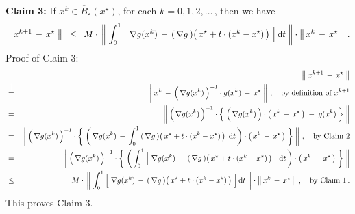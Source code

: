 \begin{enumerate}
	\vskip 0.3cm
	\noindent
	\textbf{Claim 3:}\quad
	If $x^{k} \in \overline{B}_{\varepsilon}(x^{\star})$, for each $k = 0,1,2,\ldots$\,,
	then we have
	\begin{equation*}
	\left\Vert\;x^{k+1} \,-\, x^{\star}\;\right\Vert
	\;\; \leq \;\;
		M \cdot\,
		\left\Vert\;
			\int_{0}^{1}
			\left[\;
				\overset{{\color{white}.}}{\nabla} g(x^{k})
				\,-\,
				\left(\,\nabla g\,\right)\!\left(\,x^{\star} + t\cdot(x^{k}-x^{\star})\,\right)
			\;\right]
			\d t
		\;\right\Vert
		\cdot
		\left\Vert\,x^{k} \,-\, x^{\star}\,\right\Vert\,.
	\end{equation*}
	Proof of Claim 3: \quad
	\begin{eqnarray*}
	&&
		\left\Vert\;x^{k+1} \,-\, x^{\star}\;\right\Vert
	\\
	&\overset{{\color{white}\textnormal{\Large 1}}}{=}&
		\left\Vert\;x^{k} \,-\, \left(\,\overset{{\color{white}.}}{\nabla} g(x^{k})\,\right)^{-1}\cdot g(x^{k}) \,-\, x^{\star}\;\right\Vert\,,
		\quad
		\textnormal{by definition of $x^{k+1}$}
	\\
	&=&
		\left\Vert\;
			\left(\,\overset{{\color{white}.}}{\nabla} g(x^{k})\,\right)^{-1}
			\cdot
			\left\{\;
				\left(\,\overset{{\color{white}.}}{\nabla} g(x^{k})\,\right)\cdot\left(\,x^{k} \,-\, x^{\star}\,\right)
				\;-\; g(x^{k}) 
			\;\right\}
		\;\right\Vert
	\\
	&=&
		\left\Vert\;
			\left(\,\overset{{\color{white}.}}{\nabla} g(x^{k})\,\right)^{-1}
			\cdot
			\left\{\;
				\left(\,
					\overset{{\color{white}.}}{\nabla} g(x^{k})
					\,-\,
					\int_{0}^{1}
					\left(\,\nabla g\,\right)\!\left(\,x^{\star} + t\cdot(x^{k}-x^{\star})\,\right) 
					\;\d t
				\,\right)
				\cdot\left(\,x^{k} \,-\, x^{\star}\,\right)
			\;\right\}
		\;\right\Vert\,,
		\quad
		\textnormal{by Claim 2}
	\\
	&=&
		\left\Vert\;
			\left(\,\overset{{\color{white}.}}{\nabla} g(x^{k})\,\right)^{-1}
			\cdot
			\left\{\;
				\left(\,
					\int_{0}^{1}
					\left[\;
						\overset{{\color{white}.}}{\nabla} g(x^{k})
						\,-\,
						\left(\,\nabla g\,\right)\!\left(\,x^{\star} + t\cdot(x^{k}-x^{\star})\,\right)
					\;\right]
					\d t
				\,\right)
				\cdot\left(\,x^{k} \,-\, x^{\star}\,\right)
			\;\right\}
		\;\right\Vert
	\\
	&\leq&
		M \cdot\,
		\left\Vert\;
			\int_{0}^{1}
			\left[\;
				\overset{{\color{white}.}}{\nabla} g(x^{k})
				\,-\,
				\left(\,\nabla g\,\right)\!\left(\,x^{\star} + t\cdot(x^{k}-x^{\star})\,\right)
			\;\right]
			\d t
		\;\right\Vert
		\cdot
		\left\Vert\,x^{k} \,-\, x^{\star}\,\right\Vert\,,
		\quad
		\textnormal{by Claim 1}\,.
	\end{eqnarray*}
	This proves Claim 3.


\end{enumerate}
